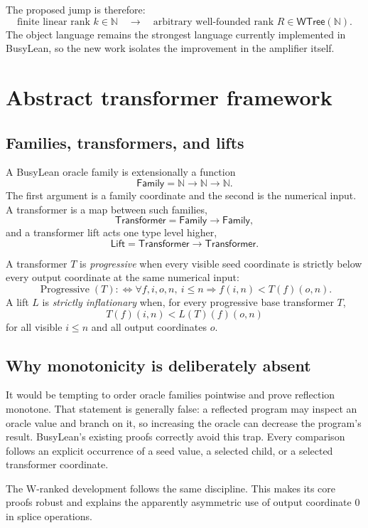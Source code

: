 \documentclass[11pt]{article}
\theoremstyle{definition}
\newcommand{\Nat}{\mathbb{N}}
\newcommand{\Family}{\mathsf{Family}}
\newcommand{\Transformer}{\mathsf{Transformer}}
\newcommand{\Lift}{\mathsf{Lift}}
\newcommand{\WTree}{\mathsf{WTree}(\Nat)}
\begin{document}
The proposed jump is therefore:
\[
  \text{finite linear rank } k\in\Nat
  \quad\longrightarrow\quad
  \text{arbitrary well-founded rank } R\in\WTree.
\]
The object language remains the strongest language currently implemented in
BusyLean, so the new work isolates the improvement in the amplifier itself.

\section{Abstract transformer framework}

\subsection{Families, transformers, and lifts}

A BusyLean oracle family is extensionally a function
\[
  \Family = \Nat\to\Nat\to\Nat.
\]
The first argument is a family coordinate and the second is the numerical
input.  A transformer is a map between such families,
\[
  \Transformer = \Family\to\Family,
\]
and a transformer lift acts one type level higher,
\[
  \Lift = \Transformer\to\Transformer.
\]

A transformer \(T\) is \emph{progressive} when every visible seed coordinate
is strictly below every output coordinate at the same numerical input:
\[
  \operatorname{Progressive}(T) :\Longleftrightarrow
  \forall f,i,o,n,\ i\leq n \Rightarrow f(i,n)<T(f)(o,n).
\]
A lift \(L\) is \emph{strictly inflationary} when, for every progressive base
transformer \(T\),
\[
  T(f)(i,n)<L(T)(f)(o,n)
\]
for all visible \(i\leq n\) and all output coordinates \(o\).

\subsection{Why monotonicity is deliberately absent}

It would be tempting to order oracle families pointwise and prove reflection
monotone.  That statement is generally false: a reflected program may inspect
an oracle value and branch on it, so increasing the oracle can decrease the
program's result.  BusyLean's existing proofs correctly avoid this trap.
Every comparison follows an explicit occurrence of a seed value, a selected
child, or a selected transformer coordinate.

The W-ranked development follows the same discipline.  This makes its core
proofs robust and explains the apparently asymmetric use of output coordinate
\(0\) in splice operations.
\end{document}

